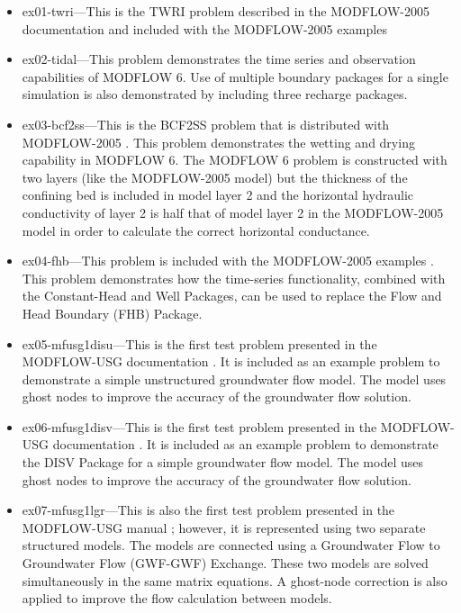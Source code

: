 \begin{itemize}
\item ex01-twri---This is the TWRI problem described in the MODFLOW-2005 documentation and included with the MODFLOW-2005 examples \citep{modflow2005}

\item ex02-tidal---This problem demonstrates the time series and observation capabilities of MODFLOW 6.  Use of multiple boundary packages for a single simulation is also demonstrated by including three recharge packages.

\item ex03-bcf2ss---This is the BCF2SS problem that is distributed with MODFLOW-2005 \citep{modflow2005}.  This problem demonstrates the wetting and drying capability in MODFLOW 6. The MODFLOW 6 problem is constructed with two layers (like the MODFLOW-2005 model) but the thickness of the confining bed is included in model layer 2 and the horizontal hydraulic conductivity of layer 2 is half that of model layer 2 in the MODFLOW-2005 model in order to calculate the correct horizontal conductance.

\item ex04-fhb---This problem is included with the MODFLOW-2005 examples \citep{modflow2005}. This problem demonstrates how the time-series functionality, combined with the Constant-Head and Well Packages, can be used to replace the Flow and Head Boundary (FHB) Package.

\item ex05-mfusg1disu---This is the first test problem presented in the MODFLOW-USG documentation \citep{modflowusg}.  It is included as an example problem to demonstrate a simple unstructured groundwater flow model.  The model uses ghost nodes to improve the accuracy of the groundwater flow solution.

\item ex06-mfusg1disv---This is the first test problem presented in the MODFLOW-USG documentation \citep{modflowusg}.  It is included as an example problem to demonstrate the DISV Package for a simple groundwater flow model.  The model uses ghost nodes to improve the accuracy of the groundwater flow solution.

\item ex07-mfusg1lgr---This is also the first test problem presented in the MODFLOW-USG manual \citep{modflowusg}; however, it is represented using two separate structured models.  The models are connected using a Groundwater Flow to Groundwater Flow (GWF-GWF) Exchange.  These two models are solved simultaneously in the same matrix equations.  A ghost-node correction is also applied to improve the flow calculation between models.


\end{itemize}
